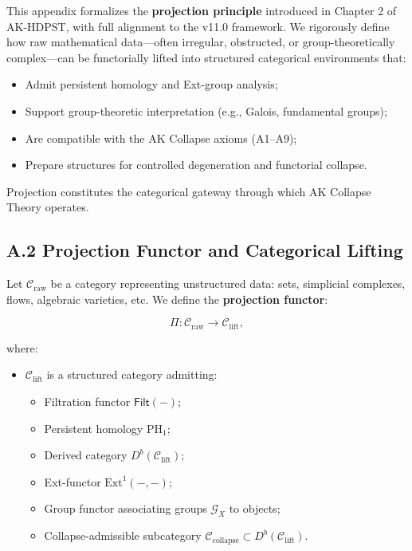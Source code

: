 \documentclass[11pt]{article}
\begin{document}
This appendix formalizes the \textbf{projection principle} introduced in Chapter 2 of AK-HDPST, with full alignment to the v11.0 framework. We rigorously define how raw mathematical data—often irregular, obstructed, or group-theoretically complex—can be functorially lifted into structured categorical environments that:

\begin{itemize}
    \item Admit persistent homology and Ext-group analysis;
    \item Support group-theoretic interpretation (e.g., Galois, fundamental groups);
    \item Are compatible with the AK Collapse axioms (A1–A9);
    \item Prepare structures for controlled degeneration and functorial collapse.
\end{itemize}

Projection constitutes the categorical gateway through which AK Collapse Theory operates.

\subsection*{A.2 Projection Functor and Categorical Lifting}

Let \( \mathcal{C}_{\mathrm{raw}} \) be a category representing unstructured data: sets, simplicial complexes, flows, algebraic varieties, etc. We define the \textbf{projection functor}:

\[
\Pi : \mathcal{C}_{\mathrm{raw}} \longrightarrow \mathcal{C}_{\mathrm{lift}},
\]

where:

\begin{itemize}
    \item \( \mathcal{C}_{\mathrm{lift}} \) is a structured category admitting:
    \begin{itemize}
        \item Filtration functor \( \mathsf{Filt}(-) \);
        \item Persistent homology \( \mathrm{PH}_1 \);
        \item Derived category \( D^b(\mathcal{C}_{\mathrm{lift}}) \);
        \item Ext-functor \( \mathrm{Ext}^1(-, -) \);
        \item Group functor associating groups \( \mathcal{G}_X \) to objects;
        \item Collapse-admissible subcategory \( \mathcal{C}_{\mathrm{collapse}} \subset D^b(\mathcal{C}_{\mathrm{lift}}) \).
    \end{itemize}
\end{itemize}
\end{document}
